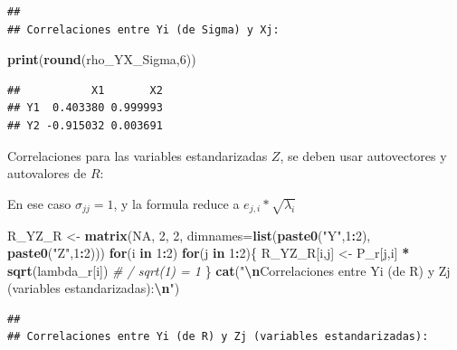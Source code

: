 \documentclass[
]{book}
\newenvironment{Shaded}{\begin{snugshade}}{\end{snugshade}}
\newcommand{\AttributeTok}[1]{\textcolor[rgb]{0.13,0.29,0.53}{#1}}
\newcommand{\CommentTok}[1]{\textcolor[rgb]{0.56,0.35,0.01}{\textit{#1}}}
\newcommand{\ConstantTok}[1]{\textcolor[rgb]{0.56,0.35,0.01}{#1}}
\newcommand{\ControlFlowTok}[1]{\textcolor[rgb]{0.13,0.29,0.53}{\textbf{#1}}}
\newcommand{\DecValTok}[1]{\textcolor[rgb]{0.00,0.00,0.81}{#1}}
\newcommand{\FunctionTok}[1]{\textcolor[rgb]{0.13,0.29,0.53}{\textbf{#1}}}
\newcommand{\NormalTok}[1]{#1}
\newcommand{\OtherTok}[1]{\textcolor[rgb]{0.56,0.35,0.01}{#1}}
\newcommand{\SpecialCharTok}[1]{\textcolor[rgb]{0.81,0.36,0.00}{\textbf{#1}}}
\newcommand{\StringTok}[1]{\textcolor[rgb]{0.31,0.60,0.02}{#1}}
\begin{document}
\begin{verbatim}
## 
## Correlaciones entre Yi (de Sigma) y Xj:
\end{verbatim}

\begin{Shaded}
\begin{Highlighting}[]
\FunctionTok{print}\NormalTok{(}\FunctionTok{round}\NormalTok{(rho\_YX\_Sigma,}\DecValTok{6}\NormalTok{))}
\end{Highlighting}
\end{Shaded}

\begin{verbatim}
##           X1       X2
## Y1  0.403380 0.999993
## Y2 -0.915032 0.003691
\end{verbatim}

Correlaciones para las variables estandarizadas \(Z\), se deben usar autovectores y autovalores de \(R\):

En ese caso \(\sigma_{jj}= 1\), y la formula reduce a \(e_{j,i} * \sqrt{\lambda_i}\)

\begin{Shaded}
\begin{Highlighting}[]
\NormalTok{R\_YZ\_R }\OtherTok{\textless{}{-}} \FunctionTok{matrix}\NormalTok{(}\ConstantTok{NA}\NormalTok{, }\DecValTok{2}\NormalTok{, }\DecValTok{2}\NormalTok{, }\AttributeTok{dimnames=}\FunctionTok{list}\NormalTok{(}\FunctionTok{paste0}\NormalTok{(}\StringTok{"Y"}\NormalTok{,}\DecValTok{1}\SpecialCharTok{:}\DecValTok{2}\NormalTok{), }\FunctionTok{paste0}\NormalTok{(}\StringTok{"Z"}\NormalTok{,}\DecValTok{1}\SpecialCharTok{:}\DecValTok{2}\NormalTok{)))}
\ControlFlowTok{for}\NormalTok{(i }\ControlFlowTok{in} \DecValTok{1}\SpecialCharTok{:}\DecValTok{2}\NormalTok{) }\ControlFlowTok{for}\NormalTok{(j }\ControlFlowTok{in} \DecValTok{1}\SpecialCharTok{:}\DecValTok{2}\NormalTok{)\{}
\NormalTok{  R\_YZ\_R[i,j] }\OtherTok{\textless{}{-}}\NormalTok{ P\_r[j,i] }\SpecialCharTok{*} \FunctionTok{sqrt}\NormalTok{(lambda\_r[i])    }\CommentTok{\# / sqrt(1) = 1}
\NormalTok{\}}
\FunctionTok{cat}\NormalTok{(}\StringTok{"}\SpecialCharTok{\textbackslash{}n}\StringTok{Correlaciones entre Yi (de R) y Zj (variables estandarizadas):}\SpecialCharTok{\textbackslash{}n}\StringTok{"}\NormalTok{)}
\end{Highlighting}
\end{Shaded}

\begin{verbatim}
## 
## Correlaciones entre Yi (de R) y Zj (variables estandarizadas):
\end{verbatim}
\end{document}
